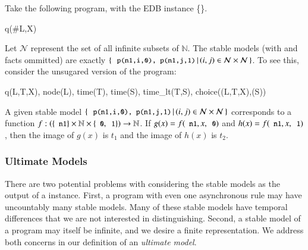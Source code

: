 \begin{example}
\label{ex:uncountable}
Take the following \lang program, with the EDB instance \{\}.

\begin{Drules}
        {q(#L,X)}
\end{Drules}

Let $\mathcal{N}$ represent the set of all infinite subsets of $\mathbb{N}$.
The stable models (with  and  facts ommitted) are exactly $\{ \, \dedalus{p(n1,i,0), p(n1,j,1)} \, | \, (i,j) \in \mathcal{N}
\times \mathcal{N} \, \}$.  To see this, consider the unsugared version of the program:

\begin{Drules}
        {q(L,T,X), node(L), time(T), time(S), time_lt(T,S), choice((L,T,X),(S))}
\end{Drules}

A given stable model $\{ \, \dedalus{p(n1,i,0), p(n1,j,1)} \, | \, (i,j)\in \mathcal{N}                                                    
\times \mathcal{N} \, \}$ corresponds to a function $f : \left(\{\dedalus{n1}\} \times \mathbb{N} \times \{\dedalus{0},\dedalus{1}\}\right) \rightarrow \mathbb{N}$.  If $g(x) = f(\dedalus{n1}, x, \dedalus{0})$ and $h(x) = f(\dedalus{n1}, x, \dedalus{1})$, then the image of $g(x)$ is $t_1$ and the image of $h(x)$ is $t_2$.
\end{example}



\subsubsection{Ultimate Models}
There are two potential problems with considering the stable models as the output of a \lang instance.  
First, a program with even one asynchronous rule may have uncountably many stable models.  Many of these stable models have temporal differences that we are not interested in distinguishing.  Second, a stable model of a \lang program may itself be infinite, and we desire a finite representation.  We address both concerns in our definition of an {\em ultimate model}.

